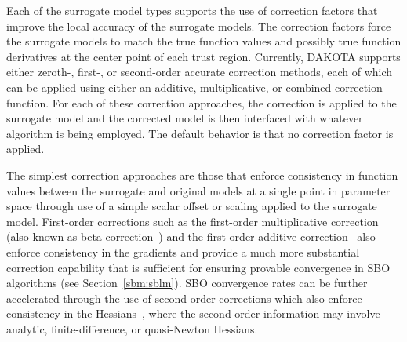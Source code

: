 Each of the surrogate model types supports the use of correction
factors that improve the local accuracy of the surrogate models. The
correction factors force the surrogate models to match the true
function values and possibly true function derivatives at the center
point of each trust region. Currently, DAKOTA supports either zeroth-,
first-, or second-order accurate correction methods, each of which can
be applied using either an additive, multiplicative, or combined
correction function. For each of these correction approaches, the
correction is applied to the surrogate model and the corrected model
is then interfaced with whatever algorithm is being employed.  The
default behavior is that no correction factor is applied.

The simplest correction approaches are those that enforce consistency
in function values between the surrogate and original models at a
single point in parameter space through use of a simple scalar offset
or scaling applied to the surrogate model.  First-order corrections
such as the first-order multiplicative correction (also known as beta
correction~\cite{Cha93}) and the first-order additive
correction~\cite{Lew00} also enforce consistency in the gradients and
provide a much more substantial correction capability that is
sufficient for ensuring provable convergence in SBO algorithms (see
Section~\ref{sbm:sblm}).  SBO convergence rates can be further
accelerated through the use of second-order corrections which also
enforce consistency in the Hessians~\cite{Eld04}, where the
second-order information may involve analytic, finite-difference, or
quasi-Newton Hessians.

